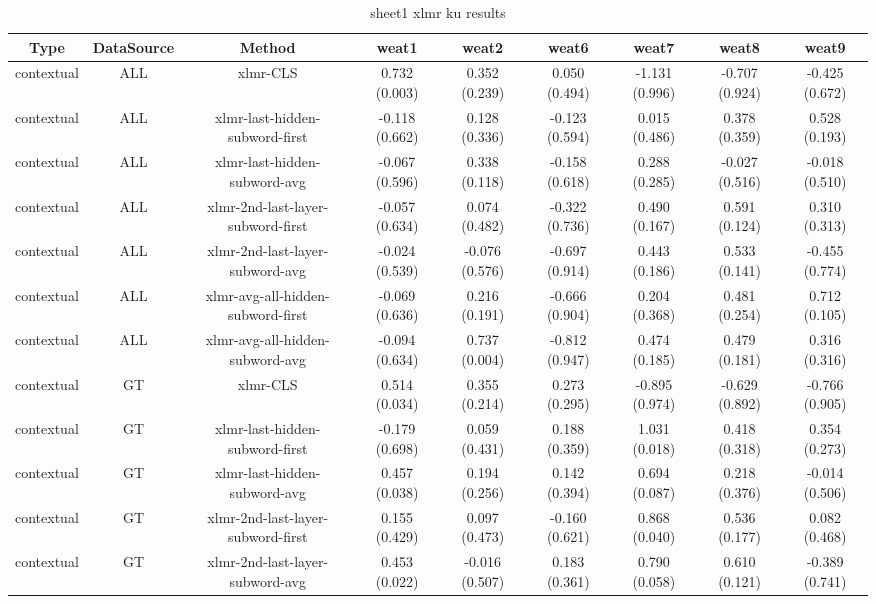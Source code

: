 \begin{sidewaystable}[htb]
    \centering
    \caption{sheet1 xlmr ku results}
    \label{appendix_tab:sheet1_xlmr_ku_results}
    \small
    \begin{tabular}{@{}ccccccccc@{}}
        \toprule
        Type & DataSource & Method & weat1 & weat2 & weat6 & weat7 & weat8 & weat9 \\
        \midrule
        contextual & ALL & xlmr-CLS & 0.732 (0.003) & 0.352 (0.239) & 0.050 (0.494) & -1.131 (0.996) & -0.707 (0.924) & -0.425 (0.672) \\
        contextual & ALL & xlmr-last-hidden-subword-first & -0.118 (0.662) & 0.128 (0.336) & -0.123 (0.594) & 0.015 (0.486) & 0.378 (0.359) & 0.528 (0.193) \\
        contextual & ALL & xlmr-last-hidden-subword-avg & -0.067 (0.596) & 0.338 (0.118) & -0.158 (0.618) & 0.288 (0.285) & -0.027 (0.516) & -0.018 (0.510) \\
        contextual & ALL & xlmr-2nd-last-layer-subword-first & -0.057 (0.634) & 0.074 (0.482) & -0.322 (0.736) & 0.490 (0.167) & 0.591 (0.124) & 0.310 (0.313) \\
        contextual & ALL & xlmr-2nd-last-layer-subword-avg & -0.024 (0.539) & -0.076 (0.576) & -0.697 (0.914) & 0.443 (0.186) & 0.533 (0.141) & -0.455 (0.774) \\
        contextual & ALL & xlmr-avg-all-hidden-subword-first & -0.069 (0.636) & 0.216 (0.191) & -0.666 (0.904) & 0.204 (0.368) & 0.481 (0.254) & 0.712 (0.105) \\
        contextual & ALL & xlmr-avg-all-hidden-subword-avg & -0.094 (0.634) & 0.737 (0.004) & -0.812 (0.947) & 0.474 (0.185) & 0.479 (0.181) & 0.316 (0.316) \\
        contextual & GT & xlmr-CLS & 0.514 (0.034) & 0.355 (0.214) & 0.273 (0.295) & -0.895 (0.974) & -0.629 (0.892) & -0.766 (0.905) \\
        contextual & GT & xlmr-last-hidden-subword-first & -0.179 (0.698) & 0.059 (0.431) & 0.188 (0.359) & 1.031 (0.018) & 0.418 (0.318) & 0.354 (0.273) \\
        contextual & GT & xlmr-last-hidden-subword-avg & 0.457 (0.038) & 0.194 (0.256) & 0.142 (0.394) & 0.694 (0.087) & 0.218 (0.376) & -0.014 (0.506) \\
        contextual & GT & xlmr-2nd-last-layer-subword-first & 0.155 (0.429) & 0.097 (0.473) & -0.160 (0.621) & 0.868 (0.040) & 0.536 (0.177) & 0.082 (0.468) \\
        contextual & GT & xlmr-2nd-last-layer-subword-avg & 0.453 (0.022) & -0.016 (0.507) & 0.183 (0.361) & 0.790 (0.058) & 0.610 (0.121) & -0.389 (0.741) \\

\end{tabular}
\end{sidewaystable}

